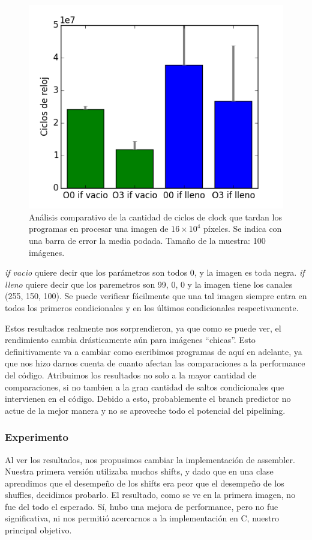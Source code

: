 \begin{figure}[H] 
	\centering
  \includegraphics[scale=0.7]{images/hsl-ifs.png}
  \caption{Análisis comparativo de la cantidad de ciclos de clock que tardan los programas en procesar una imagen de $16\times 10^4$ píxeles. Se indica con una barra de error la media podada. Tamaño de la muestra: 100 imágenes.}
\end{figure}


\textit{if vacio} quiere decir que los parámetros son todos 0, y la imagen es toda negra. \textit{if lleno} quiere decir que los paremetros son 99, 0, 0 y la imagen tiene los canales (255, 150, 100).  Se puede verificar fácilmente que una tal imagen siempre entra en todos los primeros condicionales y en los últimos condicionales respectivamente.

Estos resultados realmente nos sorprendieron, ya que como se puede ver, el rendimiento cambia drásticamente aún para imágenes ``chicas''. Esto definitivamente va a cambiar como escribimos programas de aquí en adelante, ya que nos hizo darnos cuenta de cuanto afectan las comparaciones a la performance del código.
Atribuimos los resultados no solo a la mayor cantidad de comparaciones, si no tambien a la gran cantidad de saltos condicionales que intervienen en el código. Debido a esto, probablemente el branch predictor no actue de la mejor manera y no se aproveche todo el potencial del pipelining.




\subsubsection*{Experimento}
Al ver los resultados, nos propusimos cambiar la implementación de assembler. Nuestra primera versión utilizaba muchos shifts, y dado que en una clase aprendimos que el desempeño de los shifts era peor que el desempeño de los shuffles, decidimos probarlo. El resultado, como se ve en la primera imagen, no fue del todo el esperado. Sí, hubo una mejora de performance, pero no fue significativa, ni nos permitió acercarnos a la implementación en C, nuestro principal objetivo.


